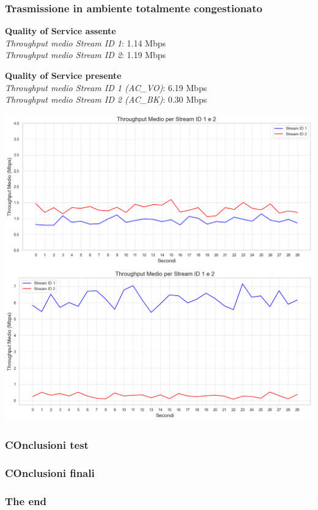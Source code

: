\documentclass{beamer}
\begin{document}
\begin{frame}
    \frametitle{Trasmissione in ambiente totalmente congestionato}
    
    \begin{minipage}{0.45\textwidth}
        \textbf{Quality of Service assente}\\
        \textit{Throughput medio Stream ID 1}: 1.14 Mbps\\
        \textit{Throughput medio Stream ID 2}: 1.19 Mbps\\
        \vspace{1cm}
        
        \textbf{Quality of Service presente}\\
        \textit{Throughput medio Stream ID 1 (AC\_VO)}: 6.19 Mbps\\
        \textit{Throughput medio Stream ID 2 (AC\_BK)}: 0.30 Mbps\\
    \end{minipage}
    \hfill
    \begin{minipage}{0.5\textwidth}
        \centering
        \includegraphics[width=\textwidth]{t1_c2_main.png} %
        \vspace{1cm}
        \includegraphics[width=\textwidth]{t2_c2_main.png} %
    \end{minipage}

\end{frame}

\begin{frame}
    \frametitle{COnclusioni test}
\end{frame}

\begin{frame}
    \frametitle{COnclusioni finali}
\end{frame}

\begin{frame}
    \frametitle{The end}
\end{frame}
\end{document}

